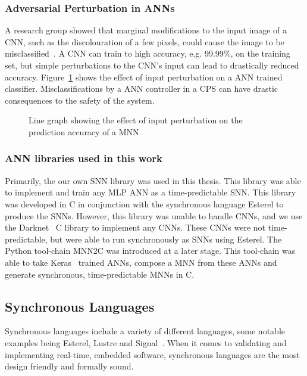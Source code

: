 \subsubsection{Adversarial Perturbation in \acfp{ANN}}
A research group showed that marginal modifications to the input image of a \acf{CNN}, such as the discolouration of a few pixels, could cause the image to be misclassified~\cite{Gehr2018AI2SA, ann-pert}.
A \ac{CNN} can train to high accuracy, e.g. 99.99\%, on the training set, but simple perturbations to the \ac{CNN}'s input can lead to drastically reduced accuracy.
Figure~\ref{fig:sign-graph-acc} shows the effect of input perturbation on a \ac{ANN} trained classifier.
Misclassifications by a \ac{ANN} controller in a \ac{CPS} can have drastic consequences to the safety of the system.

\begin{figure}[H]
	\centering
	\scalebox{0.9}{}
	\caption{Line graph showing the effect of input perturbation on the prediction accuracy of a \ac{MNN} \label{fig:sign-graph-acc}}
\end{figure}

\subsubsection{\acf{ANN} libraries used in this work}
Primarily, the our own \ac{SNN} library was used in this thesis.
This library was able to implement and train any \ac{MLP} \ac{ANN} as a time-predictable \ac{SNN}.
This library was developed in C in conjunction with the synchronous language Esterel to produce the \acp{SNN}.
However, this library was unable to handle \acp{CNN}, and we use the Darknet~\cite{darknet13} C library to implement any \acp{CNN}.
These \acp{CNN} were not time-predictable, but were able to run synchronously as \acp{SNN} using Esterel.
The Python tool-chain \acf{MNN2C} was introduced at a later stage.
This tool-chain was able to take Keras~\cite{chollet2015keras} trained \acp{ANN}, compose a \acf{MNN} from these \acp{ANN} and generate synchronous, time-predictable \acp{MNN} in C.  

\subsection{Synchronous Languages}
Synchronous languages include a variety of different languages, some notable examples being Esterel, Lustre and Signal~\cite{benveniste2003synchronous}.
When it comes to validating and implementing real-time, embedded software, synchronous languages are the most design friendly and formally sound.

